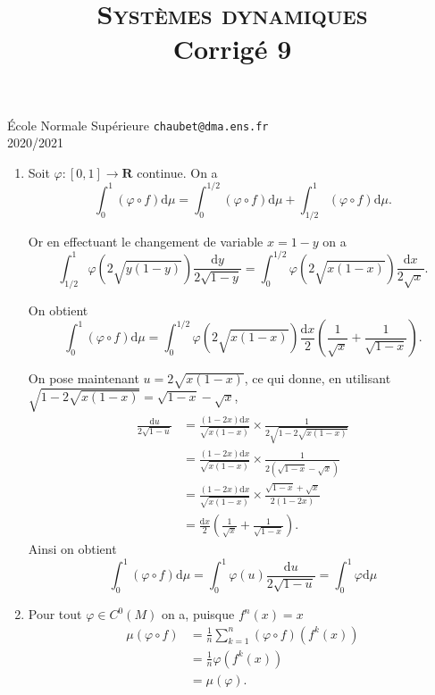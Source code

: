 \documentclass[a4paper,12pt,openany]{article}
\title{\textsc{Syst\`emes dynamiques} \\ Corrig\'e 9}
\date{}
\author{}
\theoremstyle{plain}
\theoremstyle{definition}
\newcommand{\dd}{\mathrm{d}}
\newcommand{\R}{\mathbf{R}}
\begin{document}
{\noindent \'Ecole Normale Sup\'erieure  \hfill \texttt{chaubet@dma.ens.fr} } \\
{2020/2021 \hfill }

{\let\newpage\relax\maketitle}
\maketitle

 \vspace{1.5mm} 

\begin{enumerate}
\item Soit $\varphi : [0,1] \to \R$ continue. On a
$$
\int_0^1 (\varphi \circ f) \dd \mu = \int_0^{1/2} (\varphi \circ f) \dd \mu + \int_{1/2}^1 (\varphi \circ f) \dd \mu.
$$
 
%
Or en effectuant le changement de variable $x = 1-y$ on a
$$
\int_{1/2}^1 \varphi\left(2\sqrt{y(1-y)}\right) \frac{\dd y}{2\sqrt{1-y}} = \int_0^{1/2} \varphi\left(2\sqrt{x(1-x)}\right) \frac{\dd x}{2\sqrt{x}}.
$$

On obtient
$$
\int_0^1 (\varphi \circ f) \dd \mu = \int_0^{1/2}  \varphi\left(2\sqrt{x(1-x)}\right) \frac{\dd x}{2} \left(\frac{1}{\sqrt{x}}+ \frac{1}{\sqrt{1-x}} \right).
$$




On pose maintenant $u = 2\sqrt{x(1-x)}$, ce qui donne, en utilisant $\sqrt{1-2\sqrt{x(1-x)}} = \sqrt{1-x} - \sqrt{x}$,
$$
\begin{aligned}
\frac{\dd u}{2\sqrt{1-u}} &= \frac{(1-2x) \dd x}{\sqrt{x(1-x)}} \times \frac{1}{2\sqrt{1-2\sqrt{x(1-x)}}}  \\
 &= \frac{(1-2x) \dd x}{\sqrt{x(1-x)}} \times \frac{1}{2\left(\sqrt{1-x} - \sqrt{x}\right)}  \\
 &= \frac{(1-2x) \dd x}{\sqrt{x(1-x)}} \times \frac{\sqrt{1-x} + \sqrt{x}}{2(1-2x)}  \\
 &= \frac{\dd x}{2} \left(\frac{1}{\sqrt{x}}+ \frac{1}{\sqrt{1-x}} \right). 
\end{aligned}
$$
Ainsi on obtient
$$
\int_0^1 (\varphi \circ f) \dd \mu = \int_0^1 \varphi(u) \frac{\dd u}{2\sqrt{1-u}} = \int_0^1 \varphi \dd \mu
$$

\item Pour tout $\varphi \in C^0(M)$ on a, puisque $f^n(x) = x$
$$
\begin{aligned}
\mu(\varphi \circ f) &= \frac{1}{n} \sum_{k=1}^n (\varphi \circ f) (f^k(x))  \\
&= \frac{1}{n} \varphi(f^k(x))  \\
&= \mu(\varphi).
\end{aligned}
$$


\end{enumerate}
\end{document}
